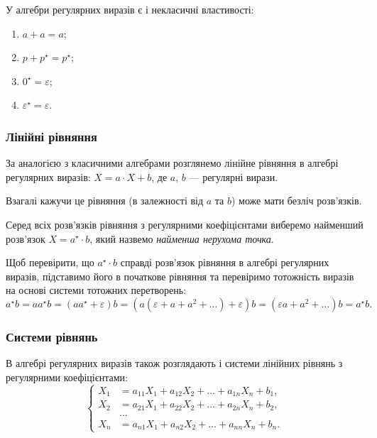 У алгебри регулярних виразів є і некласичні властивості:
\begin{enumerate}
	\item $a + a = a$;
	\item $p + p^\star = p^\star$;
	\item $0^\star = \varepsilon$;
	\item $\varepsilon^\star = \varepsilon$.
\end{enumerate}

\subsubsection{Лінійні рівняння}

За аналогією з класичними алгебрами розглянемо лінійне рівняння в алгебрі регулярних виразів: $X = a \cdot X + b$, де $a$, $b$ --- регулярні вирази. \medskip

Взагалі кажучи це рівняння (в залежності від $a$ та $b$) може мати безліч роз\-в'яз\-ків. \medskip

Серед всіх розв'язків рівняння з регулярними коефіцієнтами виберемо найменший розв'язок $X = a^\star \cdot b$, який назвемо \textit{найменша нерухома точка}. \medskip

Щоб перевірити, що $a^\star \cdot b$ справді розв'язок рівняння в алгебрі регулярних виразів, підставимо його в початкове рівняння та перевіримо тотожність виразів на основі системи тотожних перетворень:
\[ a^\star b = a a^\star b = (a a^\star + \varepsilon) b = (a (\varepsilon + a + a^2 + \ldots ) + \varepsilon) b = (\varepsilon a + a^2 + \ldots) b = a^\star b. \]

\subsubsection{Системи рівнянь}

В алгебрі регулярних виразів також розглядають і системи лінійних рівнянь з регулярними коефіцієнтами:
\begin{equation}
	\left\{
		\begin{aligned}
			X_1 &= a_{11} X_1 + a_{12} X_2 + \ldots + a_{1n} X_n + b_1, \\
			X_2 &= a_{21} X_1 + a_{22} X_2 + \ldots + a_{2n} X_n + b_2, \\
			&\ldots \\
			X_n &= a_{n1} X_1 + a_{n2} X_2 + \ldots + a_{nn} X_n + b_n.
		\end{aligned}
	\right.
\end{equation}

